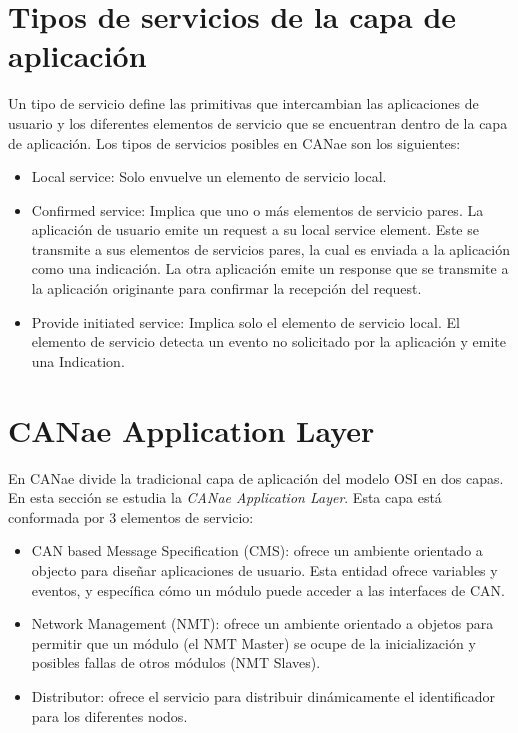 \section{Tipos de servicios de la capa de aplicación}
Un tipo de servicio define las primitivas que intercambian las aplicaciones de usuario y los diferentes elementos de servicio que se encuentran dentro de la capa de aplicación. Los tipos de servicios posibles en CANae son los siguientes:
\begin{itemize}
\item Local service: Solo envuelve un elemento de servicio local. 

\item Confirmed service: Implica que uno o más elementos de servicio pares. La aplicación de usuario emite un request a su local service element. Este se transmite a sus elementos de servicios pares, la cual es enviada a la aplicación como una indicación. La otra aplicación emite un response que se transmite a la aplicación originante para confirmar la recepción del request. 

\item Provide initiated service: Implica solo el elemento de servicio local. El elemento de servicio detecta un evento no solicitado por la aplicación y emite una Indication. 
  
\end{itemize}

\section{CANae Application Layer}
En CANae divide la tradicional capa de aplicación del modelo OSI en dos capas. En esta sección se estudia la \textit{CANae Application Layer}. Esta capa está conformada por 3 elementos de servicio:
\begin{itemize}
\item CAN based Message Specification (CMS): ofrece un ambiente orientado a objecto para diseñar aplicaciones de usuario. Esta entidad ofrece variables y eventos, y específica cómo un módulo puede acceder a las interfaces de CAN.
\item Network Management (NMT): ofrece un ambiente orientado a objetos para permitir que un módulo (el NMT Master) se ocupe de la inicialización y posibles fallas  de otros módulos (NMT Slaves).
\item Distributor: ofrece el servicio para distribuir dinámicamente el identificador para los diferentes nodos. 
\end{itemize}

